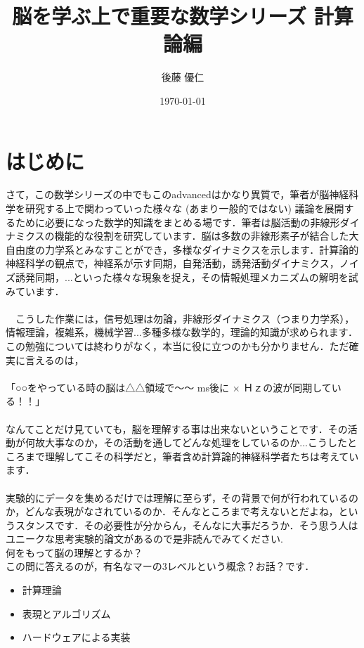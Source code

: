 \documentclass[11pt,a4paper]{jsarticle}                    %
\title{脳を学ぶ上で重要な数学シリーズ 計算論編}
\author{後藤 優仁}
\date{\today}
\begin{document}
\maketitle
%
%
\tableofcontents

\section{はじめに}
さて，この数学シリーズの中でもこのadvancedはかなり異質で，筆者が脳神経科学を研究する上で関わっていった様々な (あまり一般的ではない) 議論を展開するために必要になった数学的知識をまとめる場です．筆者は脳活動の非線形ダイナミクスの機能的な役割を研究しています．脳は多数の非線形素子が結合した大自由度の力学系とみなすことができ，多様なダイナミクスを示します．計算論的神経科学の観点で，神経系が示す同期，自発活動，誘発活動ダイナミクス，ノイズ誘発同期，...といった様々な現象を捉え，その情報処理メカニズムの解明を試みています．\\
\\
　こうした作業には，信号処理は勿論，非線形ダイナミクス（つまり力学系），情報理論，複雑系，機械学習...多種多様な数学的，理論的知識が求められます．この勉強については終わりがなく，本当に役に立つのかも分かりません．ただ確実に言えるのは，\\
\\
「○○をやっている時の脳は△△領域で～～ ms後に × Ｈｚの波が同期している！！」
\\
\\
なんてことだけ見ていても，脳を理解する事は出来ないということです．その活動が何故大事なのか，その活動を通してどんな処理をしているのか...こうしたところまで理解してこその科学だと，筆者含め計算論的神経科学者たちは考えています．\\
\\
実験的にデータを集めるだけでは理解に至らず，その背景で何が行われているのか，どんな表現がなされているのか．そんなところまで考えないとだよね，というスタンスです．その必要性が分からん，そんなに大事だろうか．そう思う人はユニークな思考実験的論文があるので是非読んでみてください\cite{radio}\cite{Jonas}.
\\
何をもって脳の理解とするか？
\\
この問に答えるのが，有名なマーの3レベルという概念？お話？\cite{mar}です．\\
\begin{itemize}
 \item{計算理論}
 \item{表現とアルゴリズム}
 \item{ハードウェアによる実装}
\end{itemize}
\end{document}
